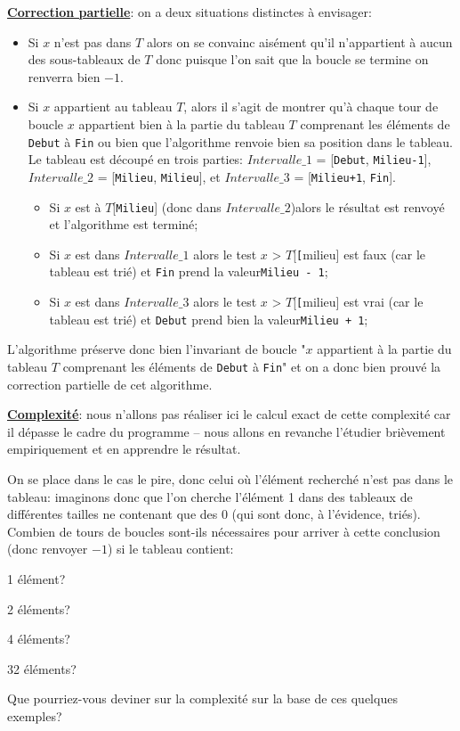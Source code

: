 \documentclass[12pt]{article}
\begin{document}
	\textbf{\uline{Correction partielle}}: on a deux situations distinctes à envisager:
	\begin{itemize}
		\item Si $x$ n'est pas dans $T$ alors on se convainc aisément qu'il n'appartient à aucun des sous-tableaux de $T$ donc puisque l'on sait que la boucle se termine on renverra bien $-1$.
		\item Si $x$ appartient au tableau $T$, alors il s'agit de montrer qu'à chaque tour de boucle $x$ appartient bien à la partie du tableau $T$ comprenant les éléments de \texttt{Debut} à \texttt{Fin} ou bien que l'algorithme renvoie bien sa position dans le tableau. Le tableau est découpé en trois parties: $Intervalle\_1$ = [\texttt{Debut}, \texttt{Milieu-1}], $Intervalle\_2$ =  [\texttt{Milieu}, \texttt{Milieu}], et $Intervalle\_3$ = [\texttt{Milieu+1}, \texttt{Fin}].
		\begin{itemize}
			\item Si $x$ est à $T$[\texttt{Milieu}] (donc dans $Intervalle\_2$)alors le résultat est renvoyé et l'algorithme est terminé;
			\item Si $x$ est dans $Intervalle\_1$ alors le test $x$ > $T$[\texttt[{milieu}] est faux (car le tableau est trié) et \texttt{Fin} prend la valeur\texttt{Milieu - 1};
			\item Si $x$ est dans $Intervalle\_3$ alors le test $x$ > $T$[\texttt[{milieu}] est vrai (car le tableau est trié) et \texttt{Debut} prend bien la valeur\texttt{Milieu + 1};
		\end{itemize}
	\end{itemize}
	
	L'algorithme préserve donc bien l'invariant de boucle "$x$ appartient à la partie du tableau $T$ comprenant les éléments de \texttt{Debut} à \texttt{Fin}" et on a donc bien prouvé la correction partielle de cet algorithme.
	
	\textbf{\uline{Complexité}}: nous n'allons pas réaliser ici le calcul exact de cette complexité car il dépasse le cadre du programme -- nous allons en revanche l'étudier brièvement empiriquement et en apprendre le résultat.
	
	\begin{MonExo}
		On se place dans le cas le pire, donc celui où l'élément recherché n'est pas dans le tableau: imaginons donc que l'on cherche l'élément 1 dans des tableaux de différentes tailles ne contenant que des 0 (qui sont donc, à l'évidence, triés). Combien de tours de boucles sont-ils nécessaires pour arriver à cette conclusion (donc renvoyer $-1$) si le tableau contient:
		\begin{alphenum}
			\item 1 élément?
			\item 2 éléments?
			\item 4 éléments?
			\item 32 éléments?
			\item Que pourriez-vous deviner sur la complexité sur la base de ces quelques exemples?
		\end{alphenum}
	\end{MonExo}
	
\end{document}
